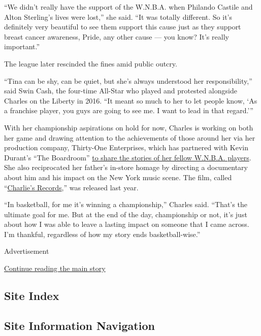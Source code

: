 ``We didn't really have the support of the W.N.B.A. when Philando
Castile and Alton Sterling's lives were lost,'' she said. ``It was
totally different. So it's definitely very beautiful to see them support
this cause just as they support breast cancer awareness, Pride, any
other cause --- you know? It's really important.''

The league later rescinded the fines amid public outcry.

``Tina can be shy, can be quiet, but she's always understood her
responsibility,'' said Swin Cash, the four-time All-Star who played and
protested alongside Charles on the Liberty in 2016. ``It meant so much
to her to let people know, `As a franchise player, you guys are going to
see me. I want to lead in that regard.'''

With her championship aspirations on hold for now, Charles is working on
both her game and drawing attention to the achievements of those around
her via her production company, Thirty-One Enterprises, which has
partnered with Kevin Durant's ``The Boardroom''
\href{https://theboardroom.tv/episode/alana-beard-marissa-coleman-talk-entrepreneurship-with-tina-charles}{to
share the stories of her fellow W.N.B.A. players}. She also reciprocated
her father's in-store homage by directing a documentary about him and
his impact on the New York music scene. The film, called
``\href{https://www.youtube.com/watch?v=0LSyINKMQDg}{Charlie's
Records},'' was released last year.

``In basketball, for me it's winning a championship,'' Charles said.
``That's the ultimate goal for me. But at the end of the day,
championship or not, it's just about how I was able to leave a lasting
impact on someone that I came across. I'm thankful, regardless of how my
story ends basketball-wise.''

Advertisement

\protect\hyperlink{after-bottom}{Continue reading the main story}

\hypertarget{site-index}{%
\subsection{Site Index}\label{site-index}}

\hypertarget{site-information-navigation}{%
\subsection{Site Information
Navigation}\label{site-information-navigation}}

